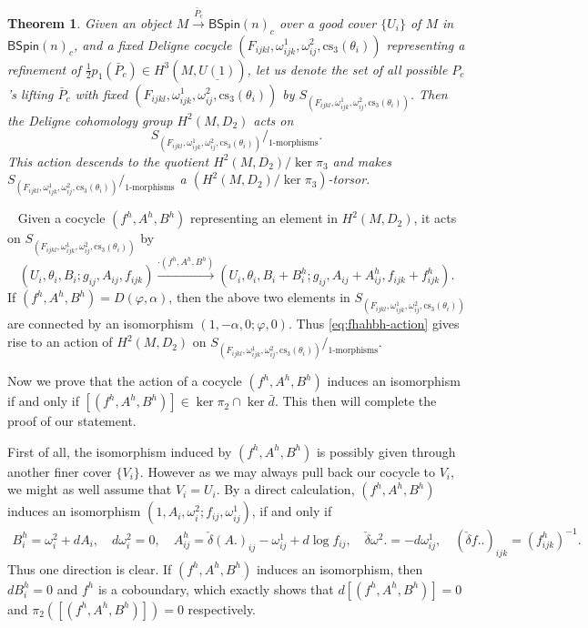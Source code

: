 \documentclass[letterpaper,10pt, oneside]{article} %
\newtheorem{thm}{Theorem}[section]
\newcommand{\BSpin}{\mathsf{BSpin}}%
\newcommand{\pf}{\noindent{\bf Proof.}\ }
\newcommand{\cs}{\mathrm{cs}}
\newcommand{\half}{\frac{1}{2}}
\begin{document}
\begin{thm}\label{thm:torsor}
Given an object $M\xrightarrow{\bar{P}_c} \BSpin(n)_c$ over a good cover $\{ U_i\}$ of $M$ in $\BSpin(n)_c$, and a fixed Deligne cocycle $(F_{ijkl}, \omega^1_{ijk}, \omega^2_{ij}, \cs_3(\theta_i))$ representing a refinement of $\half p_1 (\bar{P}_c) \in H^3(M, \underline{U(1)})$,  let us denote the set of all possible $P_c$'s lifting $\bar{P}_c$ with fixed $(F_{ijkl}, \omega^1_{ijk}, \omega^2_{ij}, \cs_3(\theta_i))$ by $S_{(F_{ijkl}, \omega^1_{ijk}, \omega^2_{ij}, \cs_3(\theta_i))}$. Then the Deligne cohomology group $H^2(M, D_2)$ acts on
\[ S_{(F_{ijkl}, \omega^1_{ijk}, \omega^2_{ij}, \cs_3(\theta_i))}/_{\text{$1$-morphisms}}. \]
This action descends to the quotient $H^2(M, D_2)/\ker \pi_3 $ and makes $ S_{(F_{ijkl}, \omega^1_{ijk}, \omega^2_{ij}, \cs_3(\theta_i))}/_{\text{$1$-morphisms}}$ a  $(H^2(M, D_2)/ \ker \pi_3 )$-torsor.
\end{thm}
\pf
Given a cocycle $(f^h, A^h, B^h)$ representing an element in $H^2(M, D_2)$, it acts on $S_{(F_{ijkl}, \omega^1_{ijk}, \omega^2_{ij}, \cs_3(\theta_i))}$ by
\begin{equation}\label{eq:fhahbh-action}
(U_i, \theta_i, B_i; g_{ij}, A_{ij}, f_{ijk}) \xrightarrow{\cdot (f^h, A^h, B^h)} (U_i, \theta_i, B_i+B_i^h; g_{ij}, A_{ij}+A^h_{ij}, f_{ijk}+f^h_{ijk}).
\end{equation}
If $(f^h, A^h, B^h)=D(\varphi, \alpha)$, then the above two elements in $S_{(F_{ijkl}, \omega^1_{ijk}, \omega^2_{ij}, \cs_3(\theta_i))}$ are connected by an isomorphism $(1, -\alpha, 0; \varphi, 0)$. Thus \eqref{eq:fhahbh-action} gives rise to an action of $H^2(M, D_2)$ on $S_{(F_{ijkl}, \omega^1_{ijk}, \omega^2_{ij}, \cs_3(\theta_i))}/_{\text{1-morphisms}}$.

Now we prove that the action of a cocycle $(f^h, A^h, B^h)$ induces an isomorphism if and only if  $[(f^h, A^h, B^h)] \in \ker \pi_2 \cap \ker \bar{d}$. This then will complete the proof of our statement.


First of all, the isomorphism induced by $(f^h, A^h, B^h)$ is possibly given through another  finer cover $\{V_i\}$. However as we may always pull back our cocycle to $V_i$, we might as well assume that $V_i=U_i$.
By a direct calculation,  $(f^h, A^h, B^h)$ induces an isomorphism $(1, A_i, \omega^2_i; f_{ij}, \omega^1_{ij})$,  if and only if
\begin{equation}\label{eq:iso-h}
\begin{split}
B^h_i = \omega^2_i+ dA_i, \quad d\omega^2_i=0, \quad A^h_{ij}=\check{\delta} (A.)_{ij} - \omega^1_{ij} + d\log f_{ij}, \quad \check{\delta}\omega^2. = - d\omega^1_{ij}, \quad (\check{\delta} f..)_{ijk} = (f^h_{ijk})^{-1}.
\end{split}
\end{equation}
Thus one direction is clear. If $(f^h, A^h, B^h)$ induces an isomorphism, then $dB^h_i=0$ and $f^h$ is a coboundary, which exactly shows that $d[(f^h, A^h, B^h)]=0$ and $\pi_2([(f^h, A^h, B^h)])=0$ respectively.
\end{document}
